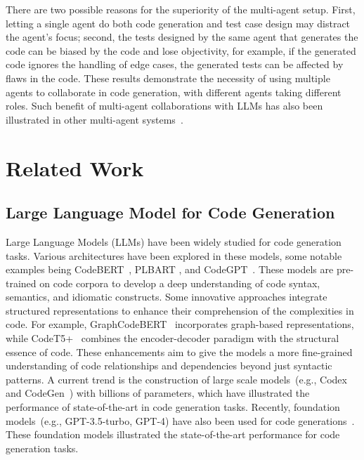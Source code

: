 \documentclass[manuscript,screen,review]{acmart}
\newcommand{\jie}[1]{{\color{blue}(Jie says: #1)}}
\begin{document}
There are two possible reasons for the superiority of the multi-agent setup. First, letting a single agent do both code generation and test case design may distract the agent's focus; second, the tests designed by the same agent that generates the code can be biased by the code and lose objectivity, for example, if the generated code ignores the handling of edge cases, the generated tests can be affected by flaws in the code.
These results demonstrate the necessity of using multiple agents to collaborate in code generation, with different agents taking different roles.
{\color{black}Such benefit of multi-agent collaborations with LLMs has also been illustrated in other multi-agent systems~\cite{Chen2023AgentVerseFM,Zhang2023ProAgentBP}.}

\section{Related Work}

\subsection{Large Language Model for Code Generation}
Large Language Models (LLMs) have been widely studied for code generation tasks. Various architectures have been explored in these models, some notable examples being CodeBERT~\cite{codebert}, PLBART \cite{Ahmad2021UnifiedPF}, and CodeGPT~\cite{CERT}. These models are pre-trained on code corpora to develop a deep understanding of code syntax, semantics, and idiomatic constructs. Some innovative approaches integrate structured representations to enhance their comprehension of the complexities in code. For example, GraphCodeBERT~\cite{Guo2020GraphCodeBERTPC} incorporates graph-based representations, while CodeT5+~\cite{wang2023codet5+} combines the encoder-decoder paradigm with the structural essence of code. These enhancements aim to give the models a more fine-grained understanding of code relationships and dependencies beyond just syntactic patterns. A current trend is the construction of large scale models~(e.g.,  Codex~\cite{chen2021evaluating} and CodeGen~\cite{nijkamp2022codegen}) with billions of parameters, which have illustrated the performance of state-of-the-art in code generation tasks. Recently, foundation models~(e.g., GPT-3.5-turbo, GPT-4) have also been used for code generations~\cite{Madaan2023SelfRefineIR,Huang2023CodeCoTAB}. These foundation models illustrated the state-of-the-art performance for code generation tasks.
\end{document}

